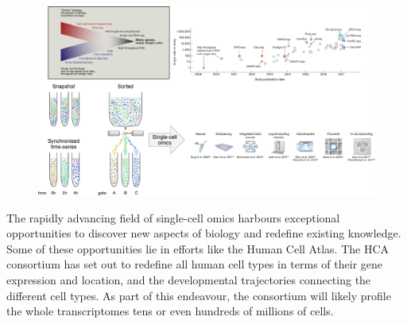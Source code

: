 \begin{figure}[htb!]
	\centering
	\includegraphics[width=\linewidth]{fig/singlecell_omics_evolution} 
	\caption{
		\textbf{} %
	}
	\label{fig:profiling_convergence}
\end{figure}

The rapidly advancing field of single-cell omics harbours exceptional opportunities to discover new aspects of biology and redefine existing knowledge. Some of these opportunities lie in efforts like the Human Cell Atlas. The HCA consortium has set out to redefine all human cell types in terms of their gene expression and location, and the developmental trajectories connecting the different cell types. As part of this endeavour, the consortium will likely profile the whole transcriptomes tens or even hundreds of millions of cells. 

